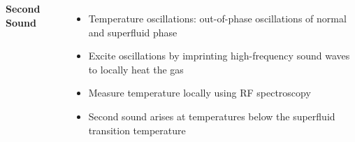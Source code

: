 \documentclass[26pt, paperwidth=36in,paperheight=48in]{tikzposter} %
\newcommand{\myfont}{\fontsize{24}{30}\selectfont}
\begin{document}
\begin{columns} 
	
	
	
	
	\block[]{\textcolor{BEC1blue}{Temperature Response -- Second Sound [3]}}
	{
		\begin{minipage}{0.21\textwidth}
			\flushleft
			\vspace{0.5cm}
			\textbf{Second Sound}
			\vspace{0.5cm}
			\myfont
			\begin{itemize}
				\item Temperature oscillations: out-of-phase oscillations of normal and superfluid phase
				
				
				\item Excite oscillations by imprinting high-frequency sound waves to locally heat the gas
				
				
				\item Measure temperature locally using RF spectroscopy
				
				
				\item Second sound arises at temperatures below the superfluid transition temperature 
				

\end{itemize}
\end{minipage}}
\end{columns}
\end{document}

